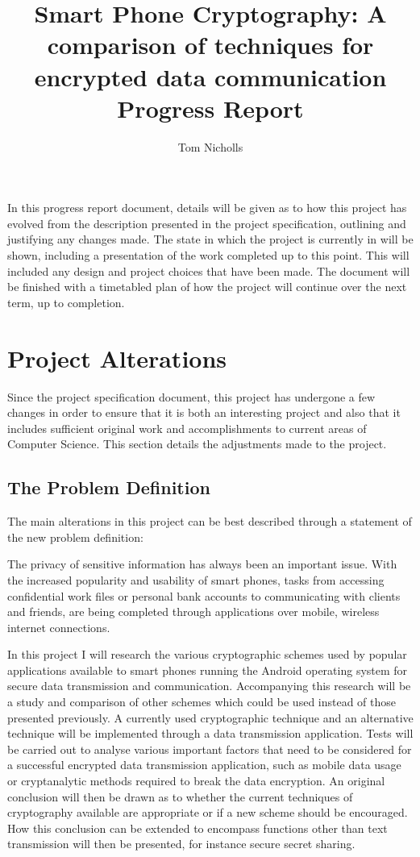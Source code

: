 \documentclass[a4paper,11pt]{article}
\title{Smart Phone Cryptography: A comparison of techniques for encrypted data communication \\ Progress Report}
\author{Tom Nicholls}
\begin{document}
\maketitle

In this progress report document, details will be given as to how this project has evolved from the description presented in the project specification, outlining and justifying any changes made. The state in which the project is currently in will be shown, including a presentation of the work completed up to this point. This will included any design and project choices that have been made. The document will be finished with a timetabled plan of how the project will continue over the next term, up to completion. 

\section{Project Alterations}

Since the project specification document, this project has undergone a few changes in order to ensure that it is both an interesting project and also that it includes sufficient original work and accomplishments to current areas of Computer Science. This section details the adjustments made to the project.

\subsection{The Problem Definition}  

The main alterations in this project can be best described through a statement of the new problem definition:

The privacy of sensitive information has always been an important issue. With the increased popularity and usability of smart phones, tasks from accessing confidential work files or personal bank accounts to communicating with clients and friends, are being completed through applications over mobile, wireless internet connections. 

In this project I will research the various cryptographic schemes used by popular applications available to smart phones running the Android operating system for secure data transmission and communication. Accompanying this research will be a study and comparison of other schemes which could be used instead of those presented previously. A currently used cryptographic technique and an alternative technique will be implemented through a data transmission application. Tests will be carried out to analyse various important factors that need to be considered for a successful encrypted data transmission application, such as mobile data usage or cryptanalytic methods required to break the data encryption. An original conclusion will then be drawn as to whether the current techniques of cryptography available are appropriate or if a new scheme should be encouraged. How this conclusion can be extended to encompass functions other than text transmission will then be presented, for instance secure secret sharing.
\end{document}
